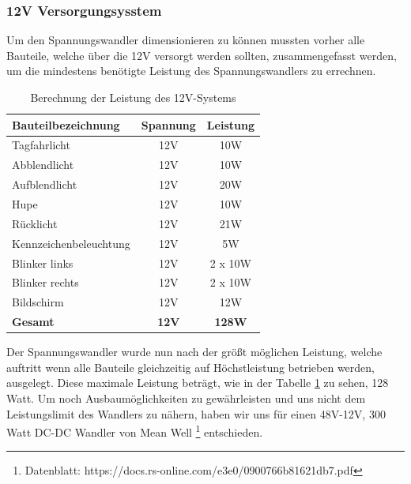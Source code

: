 \subsubsection{12V Versorgungsysstem}

Um den Spannungswandler dimensionieren zu können mussten vorher alle Bauteile, welche über die 12V versorgt werden sollten, zusammengefasst werden, um die mindestens benötigte Leistung des Spannungswandlers zu errechnen. 

\begin{table}[H]
	\begin{center}
		\begin{tabular}{|l|c|c|}
			\hline
			\textbf{Bauteilbezeichnung}     & \textbf{Spannung} & \textbf{Leistung} \\ \hline
			Tagfahrlicht           & 12V      & 10W      \\ \hline
			Abblendlicht           & 12V      & 10W      \\ \hline
			Aufblendlicht          & 12V      & 20W      \\ \hline
			Hupe                   & 12V      & 10W      \\ \hline
			Rücklicht              & 12V      & 21W      \\ \hline
			Kennzeichenbeleuchtung & 12V      & 5W       \\ \hline
			Blinker links          & 12V      & 2 x 10W  \\ \hline
			Blinker rechts         & 12V      & 2 x 10W  \\ \hline
			Bildschirm             & 12V      & 12W      \\ \hline
			\textbf{Gesamt}                 & \textbf{12V}      & \textbf{128W}     \\ \hline
		\end{tabular}
			\caption{Berechnung der Leistung des 12V-Systems}
			\label{tab:leistung12V}
	\end{center}
\end{table}

Der Spannungswandler wurde nun nach der größt möglichen Leistung, welche auftritt wenn alle Bauteile gleichzeitig auf Höchstleistung betrieben werden, ausgelegt. Diese maximale Leistung beträgt, wie in der Tabelle \ref{tab:leistung12V} zu sehen, 128 Watt. Um noch Ausbaumöglichkeiten zu gewährleisten und uns nicht dem Leistungslimit des Wandlers zu nähern, haben wir uns für einen 48V-12V, 300 Watt DC-DC Wandler von Mean Well \footnote{Datenblatt: https://docs.rs-online.com/e3e0/0900766b81621db7.pdf} entschieden. 


